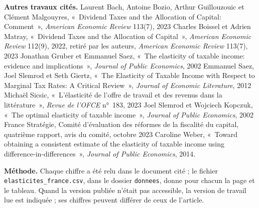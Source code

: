 \documentclass[11pt,a4paper]{article}
\begin{document}
{\textbf{Autres travaux cités.} Laurent Bach, Antoine Bozio, Arthur Guillouzouic et Clément
Malgouyres, «~Dividend Taxes and the Allocation of Capital: Comment~», \emph{American Economic
Review} 113(7), 2023 \textbullet{} Charles Boissel et Adrien Matray, «~Dividend Taxes and the
Allocation of Capital~», \emph{American Economic Review} 112(9), 2022, retiré par les auteurs,
\emph{American Economic Review} 113(7), 2023 \textbullet{} Jonathan Gruber et Emmanuel Saez, «~The
elasticity of taxable income: evidence and implications~», \emph{Journal of Public Economics}, 2002
\textbullet{} Emmanuel Saez, Joel Slemrod et Seth Giertz, «~The Elasticity of Taxable Income with
Respect to Marginal Tax Rates: A Critical Review~», \emph{Journal of Economic Literature}, 2012
\textbullet{} Michaël Sicsic, «~L'élasticité de l'offre de travail et des revenus dans la
littérature~», \emph{Revue de l'OFCE} n°~183, 2023 \textbullet{} Joel Slemrod et Wojciech Kopczuk,
«~The optimal elasticity of taxable income~», \emph{Journal of Public Economics}, 2002
\textbullet{} France Stratégie, Comité d'évaluation des réformes de la fiscalité du capital,
quatrième rapport, avis du comité, octobre 2023 \textbullet{} Caroline Weber, «~Toward obtaining a
consistent estimate of the elasticity of taxable income using difference-in-differences~»,
\emph{Journal of Public Economics}, 2014.

\textbf{Méthode.} Chaque chiffre a été relu dans le document cité ; le fichier
\texttt{elasticites\_france.csv}, dans le dossier \texttt{donnees}, donne pour chacun la page et le
tableau. Quand la version publiée n'était pas accessible, la version
de travail lue est indiquée ; ses chiffres peuvent différer de ceux de l'article.}
\end{document}

